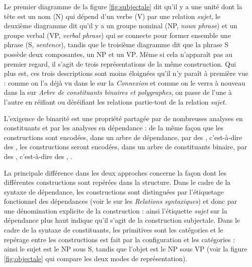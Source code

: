 {    Le premier diagramme de la figure \ref{fig:subjectale} dit qu’il y a une unité dont la tête est un nom (N) qui dépend d’un verbe (V) par une relation \textit{sujet}, le deuxième diagramme \citep{chomsky1957syntactic} dit qu’il y a un groupe nominal (NP, \textit{noun phrase}) et un groupe verbal (VP, \textit{verbal phrase}) qui se connecte pour former ensemble une phrase (S, \textit{sentence}), tandis que le troisième diagramme dit que la phrase S possède deux composantes, un NP et un VP. Même si cela n’apparaît pas au premier regard, il s’agit de trois représentations de la même construction. Qui plus est, ces trois descriptions sont moins éloignées qu’il n’y paraît à première vue : comme on l’a déjà vu dans le  sur la \textit{Connexion} et comme on le verra à nouveau dans la  sur \textit{Arbre de constituants binaires et polygraphes}, on passe de l’une à l’autre en réifiant ou déréifiant les relations partie-tout de la relation \textit{sujet}.

    L’exigence de binarité est une propriété partagée par de nombreuses analyses en constituants et par les analyses en dépendance : de la même façon que les constructions sont encodées, dans un arbre de dépendance, par des , c’est-à-dire des , les constructions seront encodées, dans un arbre de constituants binaire, par des , c’est-à-dire des , .

    La principale différence dans les deux approches concerne la façon dont les différentes constructions sont repérées dans la structure. Dans le cadre de la syntaxe de dépendance, les constructions sont distinguées par l’étiquetage fonctionnel des dépendances (voir le  sur les \textit{Relations syntaxiques}) et donc par une dénomination explicite de la construction : ainsi l’étiquette \textit{sujet} sur la dépendance plus haut indique qu’il s’agit de la construction subjectale. Dans le cadre de la syntaxe de constituants, les primitives sont les catégories et le repérage entre les constructions est fait par la configuration et les catégories : ainsi le sujet est le NP sous S, tandis que l’objet est le NP sous VP (voir la figure \ref{fig:objectale} qui compare les deux modes de représentation).

}
